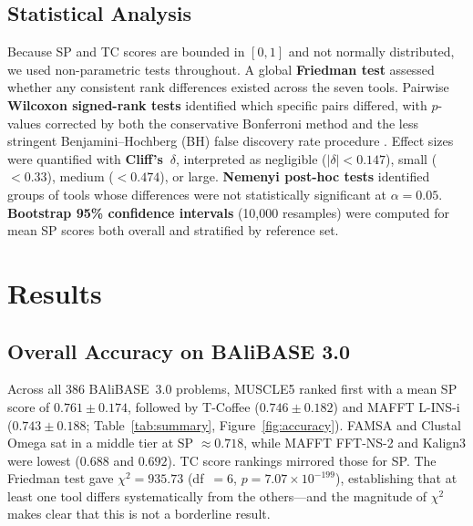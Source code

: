 \documentclass[unnumsec,webpdf,contemporary,large]{oup-authoring-template}
\begin{document}
\subsection{Statistical Analysis}

Because SP and TC scores are bounded in $[0,1]$ and not normally
distributed, we used non-parametric tests throughout.
A global \textbf{Friedman test} \citep{demsar2006statistical} assessed
whether any consistent rank differences existed across the seven tools.
Pairwise \textbf{Wilcoxon signed-rank tests} \citep{wilcoxon1945}
identified which specific pairs differed, with $p$-values corrected by
both the conservative Bonferroni method and the less stringent
Benjamini--Hochberg (BH) false discovery rate procedure
\citep{benjamini1995fdr}.
Effect sizes were quantified with \textbf{Cliff's~$\delta$}, interpreted
as negligible ($|\delta| < 0.147$), small ($< 0.33$), medium ($< 0.474$),
or large.
\textbf{Nemenyi post-hoc tests} identified groups of tools whose
differences were not statistically significant at $\alpha = 0.05$.
\textbf{Bootstrap 95\% confidence intervals} (10,000 resamples) were
computed for mean SP scores both overall and stratified by reference set.

\section{Results}

\subsection{Overall Accuracy on BAliBASE 3.0}

Across all 386 BAliBASE~3.0 problems, MUSCLE5 ranked first with a mean SP
score of $0.761 \pm 0.174$, followed by T-Coffee ($0.746 \pm 0.182$) and
MAFFT L-INS-i ($0.743 \pm 0.188$; Table~\ref{tab:summary},
Figure~\ref{fig:accuracy}).
FAMSA and Clustal Omega sat in a middle tier at SP $\approx 0.718$, while
MAFFT FFT-NS-2 and Kalign3 were lowest ($0.688$ and $0.692$).
TC score rankings mirrored those for SP.
The Friedman test gave $\chi^2 = 935.73$ (df~$= 6$,
$p = 7.07 \times 10^{-199}$), establishing that at least one tool differs
systematically from the others---and the magnitude of $\chi^2$ makes clear
that this is not a borderline result.
\end{document}
